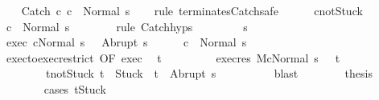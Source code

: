 \begin{isabellebody}
\ \ \isamarkupfalse%
\ {\isachardoublequoteopen}{\isasymGamma}{\isasymturnstile}Catch\ c{}\ c{}\ {\isasymdown}\ Normal\ s{\isachardoublequoteclose}\isanewline
\ \ \isamarkupfalse%
\ {\isacharparenleft}rule\ terminates{\isachardot}Catch{\isacharcomma}safe{\isacharparenright}\isanewline
\ \ \ \ \isamarkupfalse%
\ c{}{\isacharunderscore}notStuck\isanewline
\ \ \ \ \isamarkupfalse%
\ {\isachardoublequoteopen}{\isasymGamma}{\isasymturnstile}c{}\ {\isasymdown}\ Normal\ s{\isachardoublequoteclose}\isanewline
\ \ \ \ \ \ \isamarkupfalse%
\ {\isacharparenleft}rule\ Catch{\isachardot}hyps{\isacharparenright}\isanewline
\ \ \isamarkupfalse%
\isanewline
\ \ \ \ \isamarkupfalse%
\ s{\isacharprime}\isanewline
\ \ \ \ \isamarkupfalse%
\ exec{\isacharcolon}\ {\isachardoublequoteopen}{\isasymGamma}{\isasymturnstile}{\isasymlangle}c{}{\isacharcomma}Normal\ s\ {\isasymrangle}\ {\isasymRightarrow}\ Abrupt\ s{\isacharprime}{\isachardoublequoteclose}\isanewline
\ \ \ \ \isamarkupfalse%
\ {\isachardoublequoteopen}{\isasymGamma}{\isasymturnstile}c{}\ {\isasymdown}\ Normal\ s{\isacharprime}{\isachardoublequoteclose}\isanewline
\ \ \ \ \isamarkupfalse%
\ {\isacharminus}\isanewline
\ \ \ \ \ \ \isamarkupfalse%
\ exec{\isacharunderscore}to{\isacharunderscore}exec{\isacharunderscore}restrict\ {\isacharbrackleft}OF\ exec{\isacharbrackright}\ \isamarkupfalse%
\ t{\isacharprime}\ \isanewline
\ \ \ \ \ \ \ \ exec{\isacharunderscore}res{\isacharcolon}\ {\isachardoublequoteopen}{\isasymGamma}{\isacharbar}\isactrlbsub M\isactrlesub {\isasymturnstile}{\isasymlangle}c{}{\isacharcomma}Normal\ s\ {\isasymrangle}\ {\isasymRightarrow}\ t{\isacharprime}{\isachardoublequoteclose}\ \ \isanewline
\ \ \ \ \ \ \ \ t{\isacharprime}{\isacharunderscore}notStuck{\isacharcolon}\ {\isachardoublequoteopen}t{\isacharprime}\ {\isasymnoteq}\ Stuck\ {\isasymlongrightarrow}\ t{\isacharprime}\ {\isacharequal}\ Abrupt\ s{\isacharprime}{\isachardoublequoteclose}\isanewline
\ \ \ \ \ \ \ \ \isamarkupfalse%
\ blast\isanewline
\ \ \ \ \ \ \isamarkupfalse%
\ {\isacharquery}thesis\isanewline
\ \ \ \ \ \ \isamarkupfalse%
\ {\isacharparenleft}cases\ {\isachardoublequoteopen}t{\isacharprime}{\isacharequal}Stuck{\isachardoublequoteclose}{\isacharparenright}\isanewline

\end{isabellebody}

